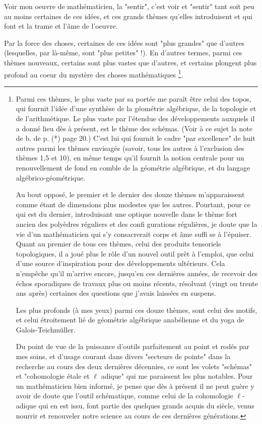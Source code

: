 Voir mon oeuvre de mathématicien, la "sentir", c'est voir et "sentir" tant soit peu au moins certaines de ces idées, et ces grands thèmes qu'elles introduisent et qui font et la trame et l'âme de l'oeuvre.

Par la force des choses, certaines de ces idées sont "plus grandes" que d'autres (lesquelles, par là-même, sont "plus petites" !). En d'autres termes, parmi ces thèmes nouveaux, certains sont plus vastes que d'autres, et certains plongent plus profond au coeur du mystère des choses mathématiques \footnote{Parmi ces thèmes, le plus vaste par sa portée me paraît être celui des topos, qui fournit l'idée d'une synthèse de la géométrie algébrique, de la topologie et de l'arithmétique. Le plus vaste par l'étendue des développements auxquels il a donné lieu dès à présent, est le thème des schémas. (Voir à ce sujet la note de b. de p. (*) page 20.) C'est lui qui fournit le cadre "par excellence" de huit autres parmi les thèmes envisagés (savoir, tous les autres à l'exclusion des thèmes 1,5 et 10), en même temps qu'il fournit la notion centrale pour un renouvellement de fond en comble de la géométrie algébrique, et du langage algébrico-géométrique.

Au bout opposé, le premier et le dernier des douze thèmes m'apparaissent comme étant de dimensions plus modestes que les autres. Pourtant, pour ce qui est du dernier, introduisant une optique nouvelle dans le thème fort ancien des polyèdres réguliers et des confi gurations régulières, je doute que la vie d'un mathématicien qui s'y consacrerait corps et âme suffi se à l'épuiser. Quant au premier de tous ces thèmes, celui des produits tensoriels topologiques, il a joué plus le rôle d'un nouvel outil prêt à l'emploi, que celui d'une source d'inspiration pour des développements ultérieurs. Cela n'empêche qu'il m'arrive encore, jusqu'en ces dernières années, de recevoir des échos sporadiques de travaux plus ou moins récents, résolvant (vingt ou trente ans après) certaines des questions que j'avais laissées en suspens.

Les plus profonds (à mes yeux) parmi ces douze thèmes, sont celui des motifs, et celui étroitement lié de géométrie algébrique anabélienne et du yoga de Galois-Teichmüller.

Du point de vue de la puissance d'outils parfaitement au point et rodés par mes soins, et d'usage courant dans divers "secteurs de pointe" dans la recherche au cours des deux dernières décennies, ce sont les volets "schémas" et "cohomologie étale et $\ell$ adique" qui me paraissent les plus notables. Pour un mathématicien bien informé, je pense que dès à présent il ne peut guère y avoir de doute que l'outil schématique, comme celui de la cohomologie $\ell$-adique qui en est issu, font partie des quelques grands acquis du siècle, venus nourrir et renouveler notre science au cours de ces dernières générations.}.

